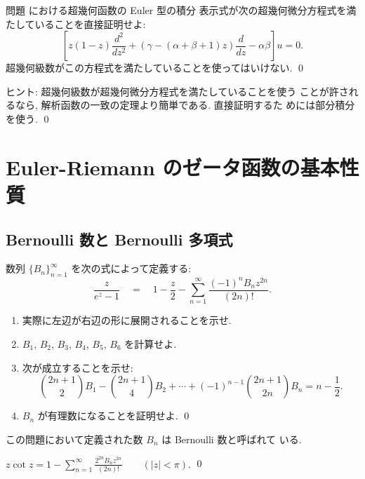 \documentclass[12pt,twoside]{jarticle}
\begin{document}
\begin{question}
  問題  における超幾何函数の Euler 型の積分
  表示式が次の超幾何微分方程式を満たしていることを直接証明せよ:
  \[
    \left[
      z(1 - z) \frac{d^2}{dz^2}
      + (\gamma - (\alpha + \beta + 1) z) \frac{d}{dz}
      - \alpha\beta
    \right] u = 0.
  \]%
  超幾何級数がこの方程式を満たしていることを使ってはいけない.
  \qed
\end{question}

\noindent ヒント: 超幾何級数が超幾何微分方程式を満たしていることを使う
ことが許されるなら, 解析函数の一致の定理より簡単である. 直接証明するた
めには部分積分を使う. 
\qed


\section{Euler-Riemann のゼータ函数の基本性質}


\subsection{Bernoulli 数と Bernoulli 多項式}

\begin{question}[Bernoulli 数]
  数列 $\{B_n\}_{n=1}^{\infty}$ を次の式によって定義する:
  \[
    \frac{z}{e^z - 1}
    \quad = \quad 
    1 - \frac{z}{2} - \sum_{n=1}^{\infty}\frac{(-1)^n B_n z^{2n}}{(2n)!}.
  \]
  \begin{enumerate}
  \item 実際に左辺が右辺の形に展開されることを示せ. 
  \item $B_1$, $B_2$, $B_3$, $B_4$, $B_5$, $B_6$ を計算せよ.
  \item 次が成立することを示せ:
  \[
      {2n + 1 \choose 2} B_1
    - {2n + 1 \choose 4} B_2
    + \cdots 
    + (-1)^{n-1} {2n + 1 \choose 2n} B_n
    = n - \frac{1}{2}.
  \]
  \item $B_n$ が有理数になることを証明せよ.
    \qed
  \end{enumerate}
\end{question}

\noindent この問題において定義された数 $B_n$ は Bernoulli 数と呼ばれて
いる.

\begin{question}
  \(
    \displaystyle
    z \cot z
    = 1 - \sum_{n=1}^\infty \frac{2^{2n}B_nz^{2n}}{(2n)!}
    \qquad (|z| < \pi).
  \)
  \qed
\end{question}
\end{document}

